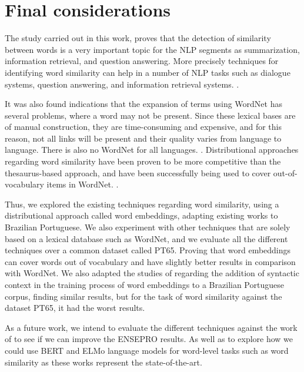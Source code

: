 \section{Final considerations}\label{chap:conclusions}

The study carried out in this work, proves that the detection of similarity between words is a very important topic for the NLP segments as summarization, information retrieval, and question answering. More precisely techniques for identifying word similarity can help in a number of NLP tasks such as dialogue systems, question answering, and information retrieval systems. \cite{Islam2007ApplicationsOC,Pilehvar2013,Agirre2009}.

It was also found indications that the expansion of terms using WordNet has several problems, where a word may not be present. Since these lexical bases are of manual construction, they are time-consuming and expensive, and for this reason, not all links will be present and their quality varies from language to language.  There is also no WordNet for all languages. \cite{Leeuwenberga2016}. Distributional approaches regarding word similarity have been proven to be more competitive than the thesaurus-based approach, and have been successfully being used to cover out-of-vocabulary items in WordNet.  \cite{Agirre2009}.


Thus, we explored the existing techniques regarding word similarity, using a distributional approach called word embeddings, adapting existing works to Brazilian Portuguese. We also experiment with other techniques that are solely based on a lexical database such as WordNet, and we evaluate all the different techniques over a common dataset called PT65. Proving that word embeddings can cover words out of vocabulary and have slightly better results in comparison with WordNet. We also adapted the studies of  regarding the addition of syntactic context in the training process of word embeddings to a Brazilian Portuguese corpus, finding similar results, but for the task of word similarity against the dataset PT65, it had the worst results.

As a future work, we intend to evaluate the different techniques against the work of  to see if we can improve the ENSEPRO results. As well as to explore how we could use BERT and ELMo language models for word-level tasks such as word similarity as these works represent the state-of-the-art.